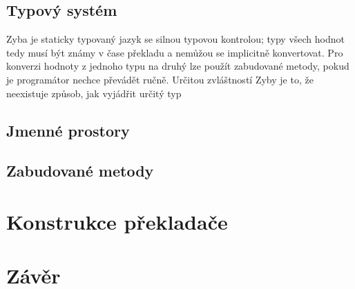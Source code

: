 \documentclass[a4paper,12pt]{article}
\begin{document}
\subsection{Typový systém}
Zyba je staticky typovaný jazyk se silnou typovou kontrolou; typy všech hodnot tedy musí být známy v čase překladu a nemůžou se implicitně konvertovat. Pro konverzi hodnoty z jednoho typu na druhý lze použít zabudované metody, pokud je programátor nechce převádět ručně. Určitou zvláštností Zyby je to, že neexistuje způsob, jak vyjádřit určitý typ

\subsection{Jmenné prostory}

\subsection{Zabudované metody}

\section{Konstrukce překladače}

\section{Závěr}

\newpage
\printbibliography[heading=bibintoc, title={Použitá literatura}]
\newpage
\end{document}
